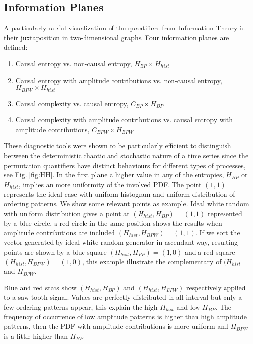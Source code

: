 \subsection{Information Planes}

A particularly useful visualization of the quantifiers from Information Theory is their juxtaposition in two-dimensional graphs.
Four information planes are defined:
\begin{enumerate}
	\item Causal entropy vs. non-causal entropy, $H_{BP} \times H_{hist}$
	\item Causal entropy with amplitude contributions vs. non-causal entropy, $H_{BPW} \times H_{hist}$
	\item Causal complexity vs. causal entropy, $C_{BP} \times H_{BP}$
	\item Causal complexity with amplitude contributions vs. causal entropy with amplitude contributions, $C_{BPW} \times H_{BPW}$
\end{enumerate}

These diagnostic tools were shown to be particularly efficient to distinguish between the deterministic chaotic and stochastic nature of a time series since the permutation quantifiers have distinct behaviours for different types of processes, see Fig. \ref{fig:HH}.
In the first plane a higher value in any of the entropies, $H_{BP}$ or $H_{hist}$, implies an more uniformity of the involved PDF.
The point $(1,1)$ represents the ideal case with uniform histogram and uniform distribution of ordering patterns.
We show some relevant points as example.
Ideal white random with uniform distribution gives a point at $(H_{hist}, H_{BP})=(1, 1)$ represented by a blue circle, a red circle in the same position shows the results when amplitude contributions are included $(H_{hist}, H_{BPW})=(1, 1)$.
If we sort the vector generated by ideal white random generator in ascendant way, resulting points are shown by a blue square $(H_{hist}, H_{BP})=(1, 0)$ and a red square $(H_{hist}, H_{BPW})=(1, 0)$, this example illustrate the complementary of $(H_{hist}$ and $H_{BPW}$.

Blue and red stars show $(H_{hist}, H_{BP})$ and $(H_{hist}, H_{BPW})$ respectively applied to a saw tooth signal.
Values are perfectly distributed in all interval but only a few ordering patterns appear, this explain the high $H_{hist}$ and low $H_{BP}$.
The frequency of occurrence of low amplitude patterns is higher than high amplitude patterns, then the PDF with amplitude contributions is more uniform and $H_{BPW}$ is a little higher than $H_{BP}$.

